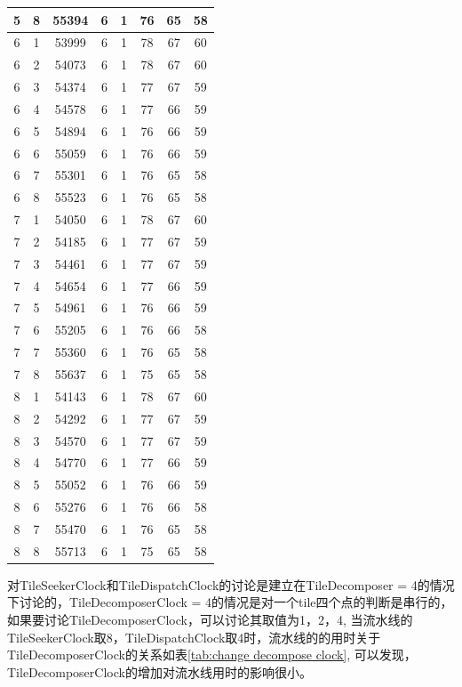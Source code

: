 \begin{table}[!ht]
{\begin{tabular}{|cccccccc|}
        5 & 8 & 55394 & 6 & 1 & 76 & 65 & 58 \\ \hline
        6 & 1 & 53999 & 6 & 1 & 78 & 67 & 60 \\ \hline
        6 & 2 & 54073 & 6 & 1 & 78 & 67 & 60 \\ \hline
        6 & 3 & 54374 & 6 & 1 & 77 & 67 & 59 \\ \hline
        6 & 4 & 54578 & 6 & 1 & 77 & 66 & 59 \\ \hline
        6 & 5 & 54894 & 6 & 1 & 76 & 66 & 59 \\ \hline
        6 & 6 & 55059 & 6 & 1 & 76 & 66 & 59 \\ \hline
        6 & 7 & 55301 & 6 & 1 & 76 & 65 & 58 \\ \hline
        6 & 8 & 55523 & 6 & 1 & 76 & 65 & 58 \\ \hline
        7 & 1 & 54050 & 6 & 1 & 78 & 67 & 60 \\ \hline
        7 & 2 & 54185 & 6 & 1 & 77 & 67 & 59 \\ \hline
        7 & 3 & 54461 & 6 & 1 & 77 & 67 & 59 \\ \hline
        7 & 4 & 54654 & 6 & 1 & 77 & 66 & 59 \\ \hline
        7 & 5 & 54961 & 6 & 1 & 76 & 66 & 59 \\ \hline
        7 & 6 & 55205 & 6 & 1 & 76 & 66 & 58 \\ \hline
        7 & 7 & 55360 & 6 & 1 & 76 & 65 & 58 \\ \hline
        7 & 8 & 55637 & 6 & 1 & 75 & 65 & 58 \\ \hline
        8 & 1 & 54143 & 6 & 1 & 78 & 67 & 60 \\ \hline
        8 & 2 & 54292 & 6 & 1 & 77 & 67 & 59 \\ \hline
        8 & 3 & 54570 & 6 & 1 & 77 & 67 & 59 \\ \hline
        8 & 4 & 54770 & 6 & 1 & 77 & 66 & 59 \\ \hline
        8 & 5 & 55052 & 6 & 1 & 76 & 66 & 59 \\ \hline
        8 & 6 & 55276 & 6 & 1 & 76 & 66 & 58 \\ \hline
        8 & 7 & 55470 & 6 & 1 & 76 & 65 & 58 \\ \hline
        8 & 8 & 55713 & 6 & 1 & 75 & 65 & 58 \\ \hline
    \end{tabular}
    }
\end{table}




对TileSeekerClock和TileDispatchClock的讨论是建立在TileDecomposer = 4的情况下讨论的，TileDecomposerClock = 4的情况是对一个tile四个点的判断是串行的，如果要讨论TileDecomposerClock，可以讨论其取值为1，2，4, 当流水线的TileSeekerClock取8，TileDispatchClock取4时，流水线的的用时关于TileDecomposerClock的关系如表\ref{tab:change decompose clock}, 可以发现，TileDecomposerClock的增加对流水线用时的影响很小。

